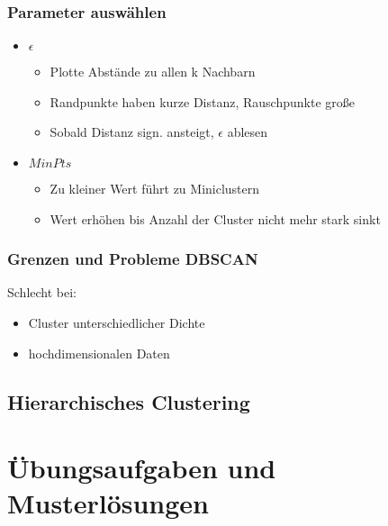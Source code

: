 \documentclass[a4paper]{article}
\begin{document}
\begin{landscape}
\begin{multicols}{3}
    \subsubsection{Parameter auswählen}
    \begin{itemize}[noitemsep,nolistsep]
        \item $\epsilon$
            \begin{itemize}[noitemsep,nolistsep]
                \item Plotte Abstände zu allen k Nachbarn
                \item Randpunkte haben kurze Distanz, Rauschpunkte große 
                \item Sobald Distanz sign. ansteigt, $\epsilon$ ablesen
            \end{itemize}
        \item $MinPts$
            \begin{itemize}[noitemsep,nolistsep]
                \item Zu kleiner Wert führt zu Miniclustern
                \item Wert erhöhen bis Anzahl der Cluster nicht mehr stark sinkt
            \end{itemize}
    \end{itemize}

    \subsubsection{Grenzen und Probleme DBSCAN}
    Schlecht bei:
    \begin{itemize}[noitemsep,nolistsep]
        \item Cluster unterschiedlicher Dichte
        \item hochdimensionalen Daten
    \end{itemize}


    \subsection{Hierarchisches Clustering}
    \end{multicols}


    \newpage


    \section{Übungsaufgaben und Musterlösungen}
\end{landscape}
\end{document}
